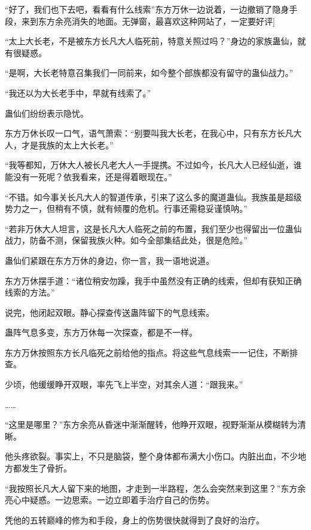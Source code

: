 
\begin{this_body}



“好了，我们也下去吧，看看有什么线索”东方万休一边说着，一边撤销了隐身手段，来到东方余亮消失的地面。无弹窗，最喜欢这种网站了，一定要好评]

“太上大长老，不是被东方长凡大人临死前，特意关照过吗？”身边的家族蛊仙，就有很疑惑。

“是啊，大长老特意召集我们一同前来，如今整个部族都没有留守的蛊仙战力。”

“我还以为大长老手中，早就有线索了。”

蛊仙们纷纷表示隐忧。

东方万休长叹一口气，语气萧索：“别要叫我大长老，在我心中，只有东方长凡大人，才是我族的太上大长老。”

“我等都知，万休大人被长凡老大人一手提携。不过如今，长凡大人已经仙逝，谁能没有一死呢？依我看来，还是得着眼现在。”

“不错。如今事关长凡大人的智道传承，引来了这么多的魔道蛊仙。我族虽是超级势力之一，但稍有不慎，就有倾覆的危机。行事还需稳妥谨慎呐。”

“若非万休大人坦言，这是长凡大人临死之前的布置，我们至少也得留出一位蛊仙战力，防备不测，保留我族火种。如今全部集结此处，很是危险。”

蛊仙们紧跟在东方万休的身边，你一言，我一语地说道。

东方万休摆手道：“诸位稍安勿躁，我手中虽然没有正确的线索，但却有获知正确线索的方法。”

说完，他闭起双眼。静心探查传送蛊阵留下的气息线索。

蛊阵气息多变，东方万休每一次探查，都是不一样。

东方万休按照东方长凡临死之前给他的指点。将这些气息线索一一记住，不断排查。

少顷，他缓缓睁开双眼，率先飞上半空，对其余人道：“跟我来。”

……

“这里是哪里？”东方余亮从昏迷中渐渐醒转，他睁开双眼，视野渐渐从模糊转为清晰。

他头疼欲裂。事实上，不只是脑袋，整个身体都布满大小伤口。内脏出血，不少地方都发生了骨折。

“我按照长凡大人留下来的地图，才走到一半路程，怎么会突然来到这里？”东方余亮心中疑惑。一边思索。一边立即着手治疗自己的伤势。

凭他的五转巅峰的修为和手段，身上的伤势很快就得到了良好的治疗。


\end{this_body}

